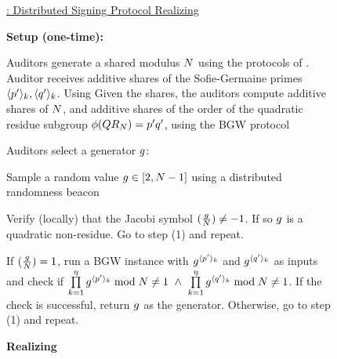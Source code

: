 \begin{figure}[h]
{\begin{minipage}[t]{\textwidth}
\itemListEnd


\smallskip\underline{\distSigningProtocol: Distributed Signing Protocol Realizing \distSigningFunc}

\smallskip\noindent\textbf{Setup (one-time):}

\itemListStart
\item Auditors generate a shared modulus $N$ using the protocols of \citet{algesheimer2002efficient,ong2005optimizing}. Auditor \auditor[\auditorIdx] receives additive shares of the Sofie-Germaine primes $\langle \sgPrime[1] \rangle_{\auditorIdx}, \langle \sgPrime[2] \rangle_{\auditorIdx}$. Using Given the shares, the auditors compute additive shares of $N$, and additive shares of the order of the quadratic residue subgroup $\orderFn(\qrGroup) = \sgPrime[1] \sgPrime[2]$, using the BGW protocol~\cite{asharov2017full}

\item Auditors select a generator $g$: 
\enumListStart
\item Sample a random value $g \in [2, N-1]$ using a distributed randomness beacon~\cite{choi2023sok}
\item Verify (locally) that the Jacobi symbol $(\frac{g}{N}) \neq -1$. If so $g$ is a quadratic non-residue. Go to step (1) and repeat.  
\item If $(\frac{g}{N}) = 1$, run a BGW instance with $\qrGen^{\langle \sgPrime[1] \rangle_{\auditorIdx}}$ and $\qrGen^{\langle \sgPrime[2] \rangle_{\auditorIdx}}$ as inputs and check if $ \prod\limits_{\auditorIdx = 1}^{\numAuditors} \qrGen^{\langle \sgPrime[1] \rangle_{\auditorIdx}} \bmod \rsaMod \neq 1 ~\land ~\prod\limits_{\auditorIdx = 1}^{\numAuditors} \qrGen^{\langle \sgPrime[2] \rangle_{\auditorIdx}} \bmod \rsaMod \neq 1$. If the check is successful, return $g$ as the generator. Otherwise, go to step (1) and repeat. 
\enumListEnd
\itemListEnd

\smallskip\noindent\textbf{Realizing \distSign}


\end{minipage}}
\end{figure}
